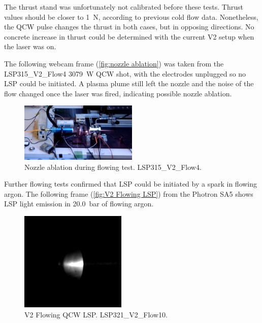         The thrust stand was unfortunately not calibrated before these tests. Thrust values should be closer to \qty{1}{N}, according to previous cold flow data. Nonetheless, the QCW pulse changes the thrust in both cases, but in opposing directions. No concrete increase in thrust could be determined with the current V2 setup when the laser was on.

        The following webcam frame (\autoref{fig:nozzle ablation}) was taken from the LSP315\_V2\_Flow4 \qty{3079}{W} QCW shot, with the electrodes unplugged so no LSP could be initiated. A plasma plume still left the nozzle and the noise of the flow changed once the laser was fired, indicating possible nozzle ablation.

        \begin{figure}[!ht]
            \centering
            \includegraphics[width=0.5\textwidth]{assets/5 discussion/Nozzle ablation.png}
            \caption{Nozzle ablation during flowing test. LSP315\_V2\_Flow4.}
            \label{fig:nozzle ablation}
        \end{figure}

        Further flowing tests confirmed that LSP could be initiated by a spark in flowing argon. The following frame (\autoref{fig:V2 Flowing LSP}) from the Photron SA5 shows LSP light emission in \qty{20.0}{bar} of flowing argon.

        \begin{figure}[!ht]
            \centering
            \includegraphics[width=0.45\textwidth]{assets/4 experiments/LSP321_V2_FLOW10.png}
            \caption{V2 Flowing QCW LSP. LSP321\_V2\_Flow10.}
            \label{fig:V2 Flowing LSP}
        \end{figure}

        



